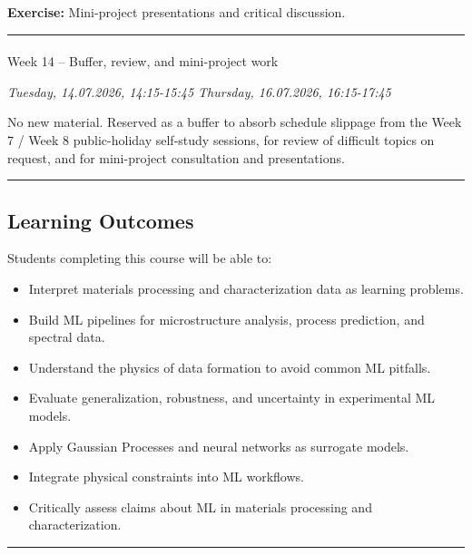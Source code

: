 \documentclass[
]{agujournal2019}
\makeatletter
\let\oldparagraph\paragraph
\renewcommand{\paragraph}{
    \@ifstar
      \xxxParagraphStar
      \xxxParagraphNoStar
  }
\newcommand{\xxxParagraphStar}[1]{\oldparagraph*{#1}\mbox{}}
\newcommand{\xxxParagraphNoStar}[1]{\oldparagraph{#1}\mbox{}}
\providecommand{\tightlist}{%
  \setlength{\itemsep}{0pt}\setlength{\parskip}{0pt}}
\makeatother
\begin{document}
\textbf{Exercise:} Mini-project presentations and critical discussion.

\begin{center}\rule{0.5\linewidth}{0.5pt}\end{center}

\paragraph{Week 14 -- Buffer, review, and mini-project
work}\label{week-14-buffer-review-and-mini-project-work}

\emph{Tuesday, 14.07.2026, 14:15-15:45 \textbar{} Thursday, 16.07.2026,
16:15-17:45}

No new material. Reserved as a buffer to absorb schedule slippage from
the Week 7 / Week 8 public-holiday self-study sessions, for review of
difficult topics on request, and for mini-project consultation and
presentations.

\begin{center}\rule{0.5\linewidth}{0.5pt}\end{center}

\subsection{Learning Outcomes}\label{learning-outcomes}

Students completing this course will be able to:

\begin{itemize}
\tightlist
\item
  Interpret materials processing and characterization data as learning
  problems.
\item
  Build ML pipelines for microstructure analysis, process prediction,
  and spectral data.
\item
  Understand the physics of data formation to avoid common ML pitfalls.
\item
  Evaluate generalization, robustness, and uncertainty in experimental
  ML models.
\item
  Apply Gaussian Processes and neural networks as surrogate models.
\item
  Integrate physical constraints into ML workflows.
\item
  Critically assess claims about ML in materials processing and
  characterization.
\end{itemize}

\begin{center}\rule{0.5\linewidth}{0.5pt}\end{center}
\end{document}
